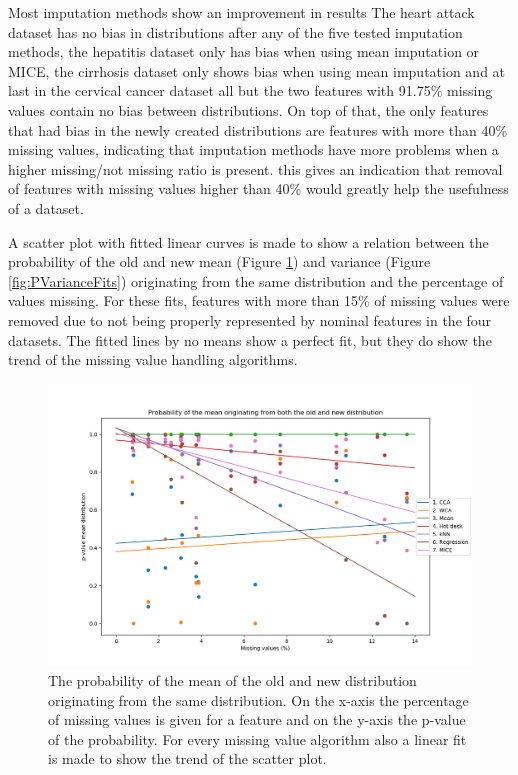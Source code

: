 \documentclass[10pt,a4paper]{article}
\begin{document}
\begin{table}[]
\begin{tabular}{l|ll|lll|ll}
		\end{tabular}
	\end{table}

	Most imputation methods show an improvement in results The heart attack dataset has no bias in distributions after any of the five tested imputation methods, the hepatitis dataset only has bias when using mean imputation or MICE, the cirrhosis dataset only shows bias when using mean imputation and at last in the cervical cancer dataset all but the two features with 91.75\% missing values contain no bias between distributions. On top of that, the only features that had bias in the newly created distributions are features with more than 40\% missing values, indicating that imputation methods have more problems when a higher missing/not missing ratio is present. this gives an indication that removal of features with missing values higher than 40\% would greatly help the usefulness of a dataset.
	
	A scatter plot with fitted linear curves is made to show a relation between the probability of the old and new mean (Figure \ref{fig:PMeanFits}) and variance (Figure \ref{fig:PVarianceFits}) originating from the same distribution and the percentage of values missing. For these fits, features with more than 15\% of missing values were removed due to not being properly represented by nominal features in the four datasets. The fitted lines by no means show a perfect fit, but they do show the trend of the missing value handling algorithms. 
	
	\begin{figure}[H]
		\centering
		\includegraphics[width=\textwidth]{P_mean.PNG}
		\caption{The probability of the mean of the old and new distribution originating from the same distribution. On the x-axis the percentage of missing values is given for a feature and on the y-axis the p-value of the probability. For every missing value algorithm also a linear fit is made to show the trend of the scatter plot.}
		\label{fig:PMeanFits}
	\end{figure}
	
\end{document}

